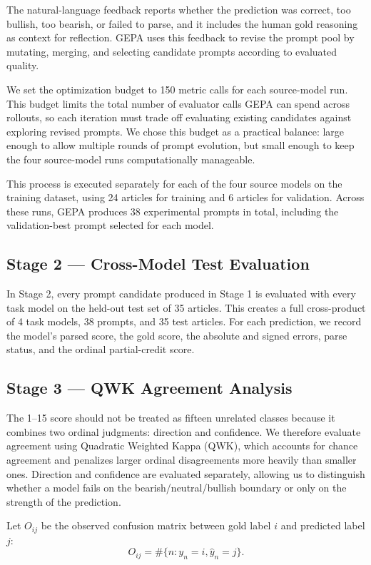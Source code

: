 \documentclass[sigconf,screen]{acmart}
\begin{document}
The natural-language feedback reports whether the prediction was correct, too
bullish, too bearish, or failed to parse, and it includes the human gold
reasoning as context for reflection. GEPA uses this feedback to revise the
prompt pool by mutating, merging, and selecting candidate prompts according to
evaluated quality.

We set the optimization budget to 150 metric calls for each source-model run.
This budget limits the total number of evaluator calls GEPA can spend across
rollouts, so each iteration must trade off evaluating existing candidates
against exploring revised prompts. We chose this budget as a practical
balance: large enough to allow multiple rounds of prompt evolution, but small
enough to keep the four source-model runs computationally manageable.

This process is executed separately for each of the four source models on the
training dataset, using 24 articles for training and 6 articles for
validation. Across these runs, GEPA produces 38 experimental prompts in total,
including the validation-best prompt selected for each model.

\subsection{Stage 2 --- Cross-Model Test Evaluation}
In Stage 2, every prompt candidate produced in Stage 1 is evaluated with every
task model on the held-out test set of 35 articles. This creates a full
cross-product of 4 task models, 38 prompts, and 35 test articles. For each
prediction, we record the model's parsed score, the gold score, the absolute
and signed errors, parse status, and the ordinal partial-credit score.

\subsection{Stage 3 --- QWK Agreement Analysis}
The 1--15 score should not be treated as fifteen unrelated classes because it
combines two ordinal judgments: direction and confidence. We therefore
evaluate agreement using Quadratic Weighted Kappa (QWK), which accounts for
chance agreement and penalizes larger ordinal disagreements more heavily than
smaller ones. Direction and confidence are evaluated separately, allowing us
to distinguish whether a model fails on the bearish/neutral/bullish boundary
or only on the strength of the prediction.

Let $O_{ij}$ be the observed confusion matrix between gold label $i$ and
predicted label $j$:
\begin{equation}
O_{ij} = \#\{n : y_n = i,\hat{y}_n = j\}.
\end{equation}
\end{document}
